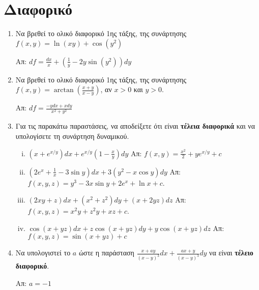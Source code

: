 \section*{Διαφορικό}

\begin{enumerate}

  \item Να βρεθεί το ολικό διαφορικό 1ης τάξης, της συνάρτησης 
    $f(x,y)=\ln(xy)+\cos(y^2)$ 

    \hfill Απ: $df=\frac{dx}{x}+\left(\frac{1}{y}-2y\sin(y^2)\right)dy$

  \item Να βρεθεί το ολικό διαφορικό 1ης τάξης, της συνάρτησης 
    $ f(x,y) = \arctan(\frac{ x+y }{ x-y }) $, αν $ x>0 $ και $ y>0 $.

    \hfill Απ: $df = \frac{ -ydx + xdy }{ x^{2} + y^{2} } $ 



  \item Για τις παρακάτω παραστάσεις, να αποδείξετε ότι είναι \textbf{τέλεια
    διαφορικά} και να υπολογίσετε τη συνάρτηση δυναμικού.
    \begin{enumerate}[i)]
      \item $ \left(x+e^{x/y}\right)dx + e^{x/y}\left(1- \frac{x}{y}\right)dy $
        \hfill Απ: $ f(x,y) = \frac{x^{2}}{2} +y e^{x/y} + c $ 

      \item $\left(2e^{x}+\frac{1}{x}-3\sin y\right)dx+3(y^2-x\cos y)dy$ 
        \hfill  Απ: $ f(x,y,z) = y^{3}-3x \sin{y} + 2e^{x} + \ln{x} +c $.

      \item $(2xy+z)dx+(x^{2}+z^{2})dy+(x+2yz)dz$ 
        \hfill  Απ: $ f(x,y,z) = x^{2}y+z^{2}y+xz +c $.


      \item $ \cos(x+yz)dx + z\cos(x+yz)dy+y\cos(x+yz)dz $
        \hfill Απ: $ f(x,y,z) = \sin(x+yz) + c $
    \end{enumerate}

  \item Να υπολογιστεί το $a$ ώστε η παράσταση $ \frac{ x + ay }{ (x-y)^{3} }dx 
    + \frac{ ax+y }{ (x-y)^{3} }dy $ να είναι \textbf{τέλειο διαφορικό}.

    \hfill Απ: $ a=-1 $
\end{enumerate}

